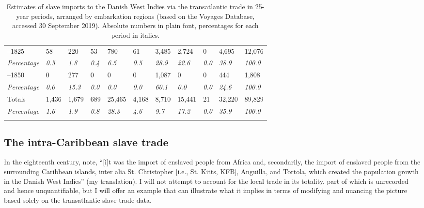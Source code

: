 \documentclass[output=paper,colorlinks,citecolor=brown]{langscibook}
\begin{document}
\begin{table}[p]
{\begin{tabular}{lllllllllll}
    \tablevspace
    1801–1825 & 58 & 220 & 53 & 780 & 61 & 3,485 & 2,724 & 0 & 4,695 & 12,076 \\
    \textit{Percentage} & \textit{0.5} & \textit{1.8} & \textit{0.4} & \textit{6.5} & \textit{0.5} & \textit{28.9} & \textit{22.6} & \textit{0.0} & \textit{38.9} & \textit{100.0} \\
    \tablevspace
    1826–1850 & 0 & 277 & 0 & 0 & 0 & 1,087 & 0 & 0 & 444 & 1,808 \\
    \textit{Percentage} & \textit{0.0} & \textit{15.3} & \textit{0.0} & \textit{0.0} & \textit{0.0} & \textit{60.1} & \textit{0.0} & \textit{0.0} & \textit{24.6} & \textit{100.0} \\
    \midrule
    Totals & 1,436 & 1,679 & 689 & 25,465 & 4,168 & 8,710 & 15,441 & 21 & 32,220 & 89,829 \\
    \textit{Percentage} & \textit{1.6} & \textit{1.9} & \textit{0.8} & \textit{28.3} & \textit{4.6} & \textit{9.7} & \textit{17.2} & \textit{0.0} & \textit{35.9} & \textit{100.0} \\
    \lspbottomrule
\end{tabular}
}
\caption{Estimates of slave imports to the Danish West Indies via the transatlantic trade in 25-year periods, arranged by embarkation regions (based on the Voyages Database, accessed 30 September 2019). Absolute numbers in plain font, percentages for each period in italics.}
\label{tab:tab1_02}
\end{table}




\subsection{The intra-Caribbean slave trade}

In the eighteenth century, \citet[150]{Simonsen_Olsen_2017} note, “[i]t was the import of enslaved people from Africa and, secondarily, the import of enslaved people from the surrounding Caribbean islands, inter alia St. Christopher [i.e., St. Kitts, KFB], Anguilla, and Tortola, which created the population growth in the Danish West Indies” (my translation). I will not attempt to account for the local trade in its totality, part of which is unrecorded and hence unquantifiable, but I will offer an example that can illustrate what it implies in terms of modifying and nuancing the picture based solely on the transatlantic slave trade data.
\end{document}
